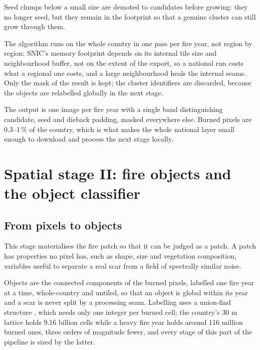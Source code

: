 \documentclass[11pt,a4paper]{article}
\begin{document}
Seed clumps below a small size are demoted to candidates before growing: they
no longer seed, but they remain in the footprint so that a genuine cluster can still grow through
them. 

The algorithm runs on the whole country in one pass per fire year, not region by region: SNIC's memory
footprint depends on its internal tile size and neighbourhood buffer, not on the extent of the
export, so a national run costs what a regional one costs, and a large neighbourhood heals the
internal seams. Only the mask of the result is kept; the cluster identifiers are discarded,
because the objects are relabelled globally in the next stage.

The output is one image per fire year with a single band distinguishing candidate, seed and dieback
padding, masked everywhere else. Burned pixels are 0.3--1\,\% of the country, which is what makes
the whole national layer small enough to download and process the next stage locally.

\section{Spatial stage II: fire objects and the object classifier}\label{sec-objects}

\subsection{From pixels to objects}

This stage materialises the fire patch so that it can be judged as a patch. A patch has properties
no pixel has, such as shape, size and vegetation composition, variables useful to separate a real 
scar from a field of spectrally similar noise.

Objects are the connected components of the burned pixels, labelled one fire year at a time,
whole-country and untiled, so that an object is global within its year and a scar is never split
by a processing seam. Labelling uses a union-find structure \parencite{tarjan1975uf}, which needs
only one integer per burned cell; the country's 30 m lattice holds 9.16 billion cells while a
heavy fire year holds around 116 million burned ones, three orders of magnitude fewer, and every
stage of this part of the pipeline is sized by the latter.
\end{document}
